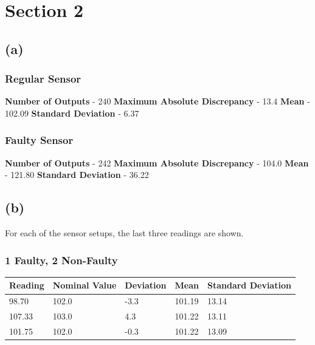 \documentclass[]{report}
\begin{document}
		\section{Section 2}
			\subsection{(a)}
				\subsubsection{Regular Sensor}
				\textbf{Number of Outputs} - 240 \newline
				\textbf{Maximum Absolute Discrepancy} - 13.4 \newline
				\textbf{Mean} - 102.09 \newline
				\textbf{Standard Deviation} - 6.37 \newline
				
				\subsubsection{Faulty Sensor}
				\textbf{Number of Outputs} - 242 \newline
				\textbf{Maximum Absolute Discrepancy} - 104.0 \newline
				\textbf{Mean} - 121.80 \newline
				\textbf{Standard Deviation} - 36.22 \newline
			
			
			\subsection{(b)}
				For each of the sensor setups, the last three readings are shown.
				\subsubsection{1 Faulty, 2 Non-Faulty}
					\begin{table}[h!]
						\begin{tabular}{| l | l | l | l | l |}
							\hline
							Reading & Nominal Value & Deviation & Mean   & Standard Deviation \\
							\hline
							98.70   & 102.0         & -3.3      & 101.19 & 13.14              \\
							107.33  & 103.0         & 4.3       & 101.22 & 13.11              \\
							101.75  & 102.0         & -0.3      & 101.22 & 13.09        	\\
							\hline      
						\end{tabular}
					\end{table}			
			
\end{document}
